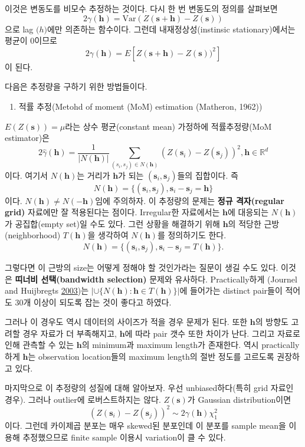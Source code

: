 \documentclass[b5paper,]{book}
\providecommand{\tightlist}{%
  \setlength{\itemsep}{0pt}\setlength{\parskip}{0pt}}
\theoremstyle{definition}
\theoremstyle{definition}
\theoremstyle{definition}
\theoremstyle{remark}
\begin{document}
이것은 변동도를 비모수 추정하는 것이다. 다시 한 번 변동도의 정의를
살펴보면
\[2\gamma(\mathbf{h})=\text{Var}(Z(\mathbf{s}+\mathbf{h})-Z(\mathbf{s}))\]
으로 lag \(\mathbf(h)\)에만 의존하는 함수이다. 그런데
내재정상성(instinsic stationary)에서는 평균이 0이므로
\[2\gamma(\mathbf{h})=E[Z(\mathbf{s}+\mathbf{h})-Z(\mathbf{s}))^{2}]\]
이 된다.

다음은 추정량을 구하기 위한 방법들이다.

\begin{enumerate}
\def\labelenumi{\arabic{enumi}.}
\tightlist
\item
  적률 추정(Metohd of moment (MoM) estimation (Matheron, 1962))
\end{enumerate}

\(E(Z(\mathbf{s}))=\mu\)라는 상수 평균(constant mean) 가정하에
적률추정량(MoM estimator)은
\[2\hat{\gamma}(\mathbf{h})=\frac{1}{|N(\mathbf{h})|}\sum_{(s_{i},s_{j})\in N(\mathbf{h})}(Z(\mathbf{s}_{i})-Z(\mathbf{s}_{j}))^{2}, \mathbf{h}\in \mathbb{R}^{d}\]
이다. 여기서 \(N(\mathbf{h})\)는 거리가 \(\mathbf{h}\)가 되는
\((\mathbf{s}_{i},\mathbf{s}_{j})\)들의 집합이다. 즉
\[N(\mathbf{h})=\{ (\mathbf{s}_{i},\mathbf{s}_{j}), \mathbf{s}_{i}-\mathbf{s}_{j}=\mathbf{h} \}\]
이다. \(N(\mathbf{h}) \neq N(\mathbf{-h})\)임에 주의하자. 이 추정량의
문제는 \textbf{정규 격자(regular grid)} 자료에만 잘 적용된다는 점이다.
Irregular한 자료에서는 \(\mathbf{h}\)에 대응되는 \(N(\mathbf{h})\)가
공집합(empty set)일 수도 있다. 그런 상황을 해결하기 위해
\(\mathbf{h}\)의 적당한 근방(neighborhood) \(T(\mathbf{h})\)을 생각하여
\(N(\mathbf{h})\)를 정의하기도 한다.
\[N(\mathbf{h})=\{ (\mathbf{s}_{i},\mathbf{s}_{j}), \mathbf{s}_{i}-\mathbf{s}_{j}=T(\mathbf{h}) \} .\]

그렇다면 이 근방의 size는 어떻게 정해야 할 것인가라는 질문이 생길 수도
있다. 이것은 \textbf{띠너비 선택(bandwidth selection)} 문제와 유사하다.
Practically하게 (Journel and Huijbregts
\protect\hyperlink{ref-Journel2003}{2003})는
\(| \cup \{N(\mathbf{h}): \mathbf{h} \in T(\mathbf{h}) \} |\)에 들어가는
distinct pair들이 적어도 30개 이상이 되도록 잡는 것이 좋다고 하였다.

그러나 이 경우도 역시 데이터의 사이즈가 적을 경우 문제가 된다. 또한
\(\mathbf{h}\)의 방향도 고려할 경우 자료가 더 부족해지고,
\(\mathbf{h}\)에 따라 pair 갯수 또한 차이가 난다. 그리고 자료로 인해
관측할 수 있는 \(\mathbf{h}\)의 minimum과 maximum length가 존재한다.
역시 practically하게 \(\mathbf{h}\)는 observation location들의 maximum
length의 절반 정도를 고르도록 권장하고 있다.

마지막으로 이 추정량의 성질에 대해 알아보자. 우선 unbiased하다(특히 grid
자료인 경우). 그러나 outlier에 로버스트하지는 않다. \(Z(\mathbf{s})\)가
Gaussian distribution이면
\[(Z(\mathbf{s}_{i})-Z(\mathbf{s}_{j}))^{2} \sim 2 \gamma(\mathbf{h})\chi_{1}^{2}\]
이다. 그런데 카이제곱 분포는 매우 skewed된 분포인데 이 분포를 sample
mean을 이용해 추정했으므로 finite sample 이용시 variation이 클 수 있다.
\end{document}
